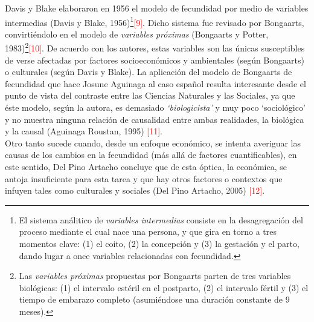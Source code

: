 Davis y Blake elaboraron en 1956 el modelo de fecundidad por medio de variables intermedias (Davis y Blake, 1956)\footnote{El sistema análitico de \textit{variables intermedias} consiste en la desagregación del proceso mediante el cual nace una persona, y que gira en torno a tres momentos clave: (1) el coito, (2) la concepción y (3) la gestación y el parto, dando lugar a once variables relacionadas con fecundidad.}\textcolor{red}{[9]}. Dicho sistema fue revisado por Bongaarts, convirtiéndolo en el modelo de \textit{variables próximas} (Bongaarts y Potter, 1983)\footnote{Las \textit{variables próximas} propuestas por Bongaarts parten de tres variables biológicas: (1) el intervalo estéril en el postparto, (2) el intervalo fértil y (3) el tiempo de embarazo completo (asumiéndose una duración constante de 9 meses).}\textcolor{red}{[10]}. De acuerdo con los autores, estas variables son las únicas susceptibles de verse afectadas por factores socioeconómicos y ambientales (según Bongaarts) o culturales (según Davis y Blake). La aplicación del modelo de Bongaarts de fecundidad que hace Josune Aguinaga al caso español resulta interesante desde el punto de vista del contraste entre las Ciencias Naturales y las Sociales, ya que éste modelo, según la autora, es demasiado \textit{`biologicista'} y muy poco `sociológico' y no muestra ninguna relación de causalidad entre ambas realidades, la biológica y la causal (Aguinaga Roustan, 1995) \textcolor{red}{[11]}.\\

Otro tanto sucede cuando, desde un enfoque económico, se intenta averiguar las causas de los cambios en la fecundidad (más allá de factores cuantificables), en este sentido, Del Pino Artacho concluye que de esta óptica, la económica, se antoja insuficiente para esta tarea y que hay otros factores o contextos que infuyen tales como culturales y sociales (Del Pino Artacho, 2005) \textcolor{red}{[12]}.\\
 
